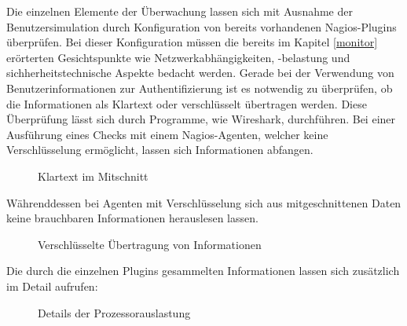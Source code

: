 Die einzelnen Elemente der Überwachung lassen sich mit Ausnahme der Benutzersimulation durch Konfiguration von bereits vorhandenen Nagios-Plugins überprüfen.
Bei dieser Konfiguration müssen die bereits im Kapitel \ref{monitor} erörterten Gesichtspunkte wie Netzwerkabhängigkeiten, -belastung und sichherheitstechnische Aspekte bedacht werden.
Gerade bei der Verwendung von Benutzerinformationen zur Authentifizierung ist es notwendig zu überprüfen, ob die Informationen als Klartext oder verschlüsselt übertragen werden.
Diese Überprüfung lässt sich durch Programme, wie Wireshark, durchführen.
Bei einer Ausführung eines Checks mit einem Nagios-Agenten, welcher keine Verschlüsselung ermöglicht, lassen sich Informationen abfangen.
\begin{figure}[ht]
	\centering
		\caption{Klartext im Mitschnitt}
		\label{klartxt}
\end{figure}

Währenddessen bei Agenten mit Verschlüsselung sich aus mitgeschnittenen Daten keine brauchbaren Informationen herauslesen lassen.
\begin{figure}[ht]
	\centering
		\caption{Verschlüsselte Übertragung von Informationen}
		\label{ssltxt}
\end{figure}

Die durch die einzelnen Plugins gesammelten Informationen lassen sich zusätzlich im Detail aufrufen:

\begin{figure}[ht]
	\centering
		\caption{Details der Prozessorauslastung}
		\label{cpuload}
\end{figure}


